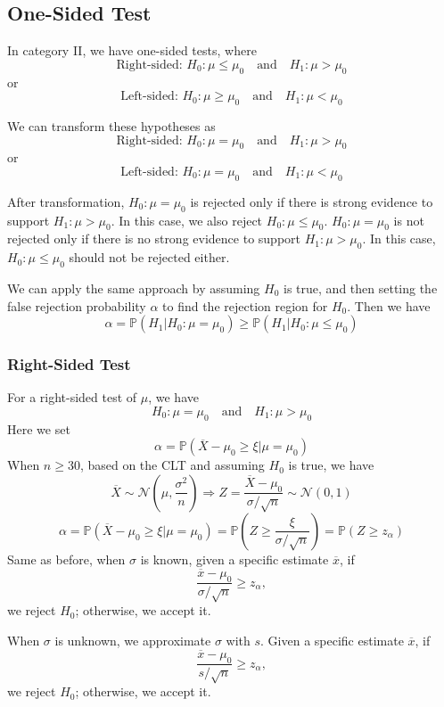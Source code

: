 \subsection{One-Sided Test}
In category II, we have one-sided tests, where
\[
  \text{Right-sided: } H_0: \mu \leq \mu_0 \quad \text{and} \quad H_1: \mu > \mu_0
\]
or
\[
  \text{Left-sided: } H_0: \mu \geq \mu_0 \quad \text{and} \quad H_1: \mu < \mu_0
\]

We can transform these hypotheses as  
\[
  \text{Right-sided: } H_0: \mu = \mu_0 \quad \text{and} \quad H_1: \mu > \mu_0
\]
or
\[
  \text{Left-sided: } H_0: \mu = \mu_0 \quad \text{and} \quad H_1: \mu < \mu_0
\]

After transformation, \(H_0: \mu = \mu_0\) is rejected only if there is strong evidence to support \(H_1: \mu > \mu_0\). In this case, we also reject \(H_0: \mu \leq \mu_0\).  
\(H_0: \mu = \mu_0\) is not rejected only if there is no strong evidence to support \(H_1: \mu > \mu_0\). In this case, \(H_0: \mu \leq \mu_0\) should not be rejected either.

We can apply the same approach by assuming \(H_0\) is true, and then setting the false rejection probability \(\alpha\) to find the rejection region for \(H_0\). Then we have 
\[
  \alpha = \mathbb{P}(H_1 \vert H_0: \mu = \mu_0) \geq \mathbb{P}(H_1 \vert H_0: \mu \leq \mu_0)
\]

\subsubsection{Right-Sided Test}
For a right-sided test of \(\mu\), we have 
\[
  H_0: \mu = \mu_0 \quad \text{and} \quad H_1: \mu > \mu_0
\]
Here we set
\[
  \alpha = \mathbb{P} (\overline{X} - \mu_0 \geq \xi \vert \mu = \mu_0)
\]
When \(n \geq 30\), based on the CLT and assuming \(H_0\) is true, we have 
\[
  \overline{X} \sim \mathcal{N} \left(\mu, \frac{\sigma^2}{n}\right) \Longrightarrow Z = \frac{\overline{X} - \mu_0}{\sigma / \sqrt{n}} \sim \mathcal{N} (0, 1)
\]
\[
  \alpha = \mathbb{P} \left(\overline{X} - \mu_0 \geq \xi \vert \mu = \mu_0 \right) = \mathbb{P} \left(Z \geq \frac{\xi}{\sigma / \sqrt{n}} \right) = \mathbb{P} \left(Z \geq z_{\alpha} \right)
\]
Same as before, when \(\sigma\) is known, given a specific estimate \(\overline{x}\), if 
\[
  \frac{\overline{x} - \mu_0}{\sigma / \sqrt{n}} \geq z_{\alpha}, 
\]
we reject \(H_0\); otherwise, we accept it.

When \(\sigma\) is unknown, we approximate \(\sigma\) with \(s\). Given a specific estimate \(\overline{x}\), if 
\[
  \frac{\overline{x} - \mu_0}{s / \sqrt{n}} \geq z_{\alpha},
\]
we reject \(H_0\); otherwise, we accept it.


